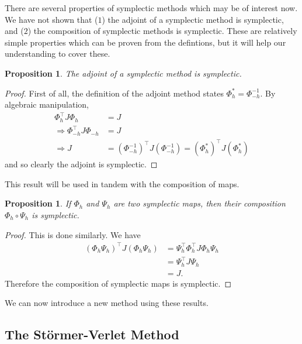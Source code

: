\documentclass{report}
\theoremstyle{exampstyle} \newtheorem{example}[theorem]{Example}
\theoremstyle{exampstyle} \newtheorem{remark}[theorem]{Remark}
\theoremstyle{exampstyle} \newtheorem{definition}[theorem]{Definition}
\theoremstyle{exampstyle} \newtheorem{lemma}[theorem]{Lemma}
\theoremstyle{exampstyle} \newtheorem{proposition}[theorem]{Proposition}
\begin{document}
There are several properties of symplectic methods which may be of interest now.
We have not shown that ($1$) the adjoint of a symplectic method is symplectic, and ($2$) the composition of symplectic methods is symplectic.
These are relatively simple properties which can be proven from the defintions, but it will help our understanding to cover these.
\begin{proposition}
	The adjoint of a symplectic method is symplectic.
\end{proposition}
\begin{proof}
	First of all, the definition of the adjoint method states $\Phi^*_h = \Phi^{-1}_{-h}$.
	By algebraic manipulation,
	\begin{align*}
		\Phi_h^\intercal J \Phi_h &= J \\
		\Rightarrow \Phi_{-h}^\intercal J \Phi_{-h} &= J \\
		\Rightarrow J &= (\Phi_{-h}^{-1})^\intercal J (\Phi_{-h}^{-1}) = (\Phi_h^*)^\intercal J (\Phi_h^*)
	\end{align*}
	and so clearly the adjoint is symplectic.
\end{proof}
This result will be used in tandem with the composition of maps.
\begin{proposition}
	If $\Phi_h$ and $\Psi_h$ are two symplectic maps, then their composition $\Phi_h \circ \Psi_h$ is symplectic.
\end{proposition}
\begin{proof}
	This is done similarly. We have
	\begin{align*}
		\left(\Phi_h \Psi_h\right)^\intercal J \left(\Phi_h \Psi_h\right) &= \Psi_h^\intercal \Phi_h^\intercal J \Phi_h \Psi_h \\
		&= \Psi_h^\intercal J \Psi_h \\
		&= J.
	\end{align*}
	Therefore the composition of symplectic maps is symplectic.	
\end{proof}

We can now introduce a new method using these results.

\subsection{The St\"ormer-Verlet Method}
\end{document}
